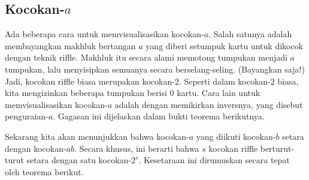 \subsection*{Kocokan-$a$}
Ada beberapa cara untuk memvisualisasikan kocokan-$a$.  Salah satunya adalah membayangkan
makhluk bertangan $a$ yang diberi setumpuk kartu untuk dikocok dengan teknik riffle.
Makhluk itu secara alami memotong tumpukan menjadi $a$ tumpukan, lalu menyisipkan semuanya
secara berselang-seling.  (Bayangkan saja!)  Jadi, kocokan riffle biasa merupakan
kocokan-2.  Seperti dalam kocokan-2 biasa, kita mengizinkan beberapa tumpukan berisi 0
kartu.  Cara lain untuk memvisualisasikan kocokan-$a$ adalah dengan memikirkan inversnya,
yang disebut penguraian-$a$.  Gagasan ini dijelaskan dalam bukti teorema berikutnya.
\par Sekarang kita akan menunjukkan bahwa kocokan-$a$ yang diikuti kocokan-$b$ setara
dengan kocokan-$ab$.  Secara khusus, ini berarti bahwa $s$ kocokan riffle berturut-turut
setara dengan satu kocokan-$2^s$.  Kesetaraan ini dirumuskan secara tepat oleh teorema
berikut.
\noindent
